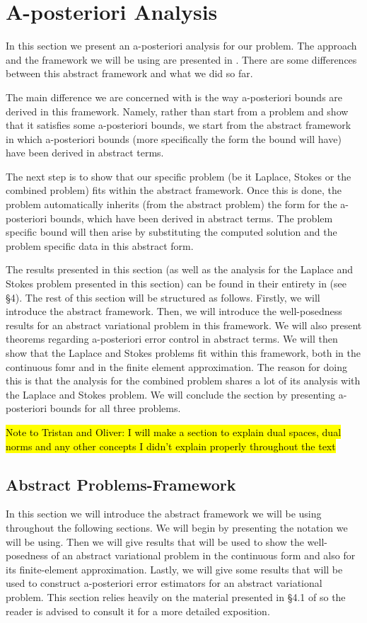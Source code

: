 \documentclass[12pt,a4paper]{article}
\theoremstyle{definition}
\begin{document}
\section{A-posteriori Analysis} %
In this section we present an a-posteriori analysis for our problem.  The approach and the framework we will be using are presented in \cite{verfurth2013posteriori}.  There are some differences between this abstract framework and what we did so far.  

The main difference we are concerned with is the way a-posteriori bounds are derived in this framework.  Namely,  rather than start from a problem and show that it satisfies some a-posteriori bounds, we start from the abstract framework in which a-posteriori bounds (more specifically the form the bound will have) have been derived in abstract terms.  

The next step is to show that our specific problem (be it Laplace, Stokes or the combined problem) fits within the abstract framework.  Once this is done, the problem automatically inherits (from the abstract problem) the form for the  a-posteriori  bounds, which have been derived in abstract terms.  The problem specific bound will then arise  by substituting the computed solution and the problem specific data in this abstract form. 

The results presented in this section (as well as the analysis for the Laplace and Stokes problem presented in this section) can be found in their entirety in \cite{verfurth2013posteriori} (see \S 4). The rest of this section will be structured as follows.  Firstly, we will introduce the abstract framework.  Then, we will introduce the well-posedness results for an abstract variational problem in this framework.   We will also present theorems regarding a-posteriori error control in abstract terms.  We will then show that the Laplace and Stokes problems fit within this framework, both in the continuous fomr and in the finite element approximation. The reason for doing this is that the analysis for the combined problem shares a lot of its analysis with the Laplace and Stokes problem.   We will conclude the section by presenting a-posteriori bounds for all three problems.   

\hl{Note to Tristan and Oliver:  I will make a section to explain dual spaces, dual norms and any other concepts I didn't explain properly throughout the text}
\subsection{Abstract Problems-Framework}\label{sec_abst_var_prob}
In this section we will introduce the abstract framework we will be using throughout the following sections.  We will begin by presenting the notation we will be using.  Then we will give results that will be used to show the well-posedness of an abstract variational problem in the continuous form and also for its finite-element approximation.  Lastly, we will give some results that will be used to construct a-posteriori error estimators for an abstract variational problem. This section relies heavily on the material presented in \S 4.1 of \cite{verfurth2013posteriori} so the reader is advised to consult it for a more detailed exposition.
\end{document}
